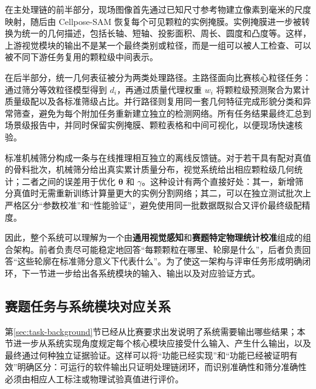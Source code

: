 在主处理链的前半部分，现场图像首先通过已知尺寸参考物建立像素到毫米的尺度映射，随后由 Cellpose-SAM 恢复每个可见颗粒的实例掩膜。实例掩膜进一步被转换为统一的几何描述，包括长轴、短轴、投影面积、周长、圆度和凸度等。这样，上游视觉模块的输出不是某一个最终类别或粒径，而是一组可以被人工检查、可以被不同下游任务复用的颗粒级中间表示。

在后半部分，统一几何表征被分为两类处理路径。主路径面向比赛核心粒径任务：通过筛分等效粒径模型得到 $d_i$，再通过质量代理权重 $w_i$ 将颗粒级预测聚合为累计质量级配以及各标准筛级占比。并行路径则复用同一套几何特征完成形貌分类和异常筛查，避免为每个附加任务重新建立独立的检测网络。所有任务结果最终汇总到场景级报告中，并同时保留实例掩膜、颗粒表格和中间可视化，以便现场快速核验。

标准机械筛分构成一条与在线推理相互独立的离线反馈链。对于若干具有配对真值的骨料批次，机械筛分给出真实累计质量分布，视觉系统给出相应颗粒级几何统计；二者之间的误差用于优化 $\boldsymbol{\theta}$ 和 $\gamma$。这种设计有两个直接好处：其一，新增筛分真值时无需重新训练计算量更大的实例分割网络；其二，可以在独立测试批次上严格区分“参数校准”和“性能验证”，避免使用同一批数据既拟合又评价最终级配精度。

因此，整个系统可以理解为一个由\textbf{通用视觉感知}和\textbf{赛题特定物理统计校准}组成的组合架构。前者负责尽可能稳定地回答“每颗颗粒在哪里、轮廓是什么”，后者负责回答“这些轮廓在标准筛分意义下代表什么”。为了使这一架构与评审任务形成明确闭环，下一节进一步给出各系统模块的输入、输出以及对应验证方式。

\subsection{赛题任务与系统模块对应关系}
\label{sec:module-task-mapping}

第\ref{sec:task-background}节已经从比赛要求出发说明了系统需要输出哪些结果；本节进一步从系统实现角度规定每个核心模块应接受什么输入、产生什么输出，以及最终通过何种独立证据验证。这样可以将“功能已经实现”和“功能已经被证明有效”明确区分：可运行的软件输出只证明处理链闭环，而识别准确性和筛分准确性必须由相应人工标注或物理试验真值进行评价。

